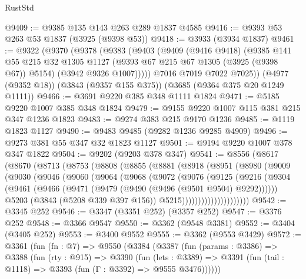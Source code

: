 \begin{lexlean}{RustStd}
\begin{coremodule}
@9409 := @9385 @135 @143 @263 @289 @1837 @4585
@9416 := @9393 @53 @263 @53 @1837 (@3925 (@9398 @53))
@9418 := @3933 (@3934 @1837)
@9461 := @9322
    (@9370
      (@9378
        (@9383
          (@9403
            (@9409
              (@9416 @9418)
              (@9385
                @141
                @55
                @215
                @32
                @1305
                @1127
                (@9393 @67 @215 @67 @1305 (@3925 (@9398 @67)) @5154)
                (@3942 @9326 @1007)))))
        @7016
        @7019
        @7022
        @7025))
    (@4977 (@9352 @18))
    (@3843 (@9357 @155 @375))
    (@3685 (@9364 @375 @20 @1249 @1111))
@9466 := @3691 @9220 @385 @348 @1111 @1824
@9471 := @5185 @9220 @1007 @385 @348 @1824
@9479 := @9155 @9220 @1007 @115 @381 @215 @347 @1236 @1823
@9483 := @9274 @383 @215 @9170 @1236
@9485 := @1119 @1823 @1127
@9490 := @9483 @9485 (@9282 @1236 @9285 @4909)
@9496 := @9273 @381 @55 @347 @32 @1823 @1127
@9501 := @9194 @9220 @1007 @378 @347 @1822
@9504 := @9202 (@9203 @378 @347)
@9541 := @8556
    (@8617
      (@8670
        (@8713
          (@8753
            (@8808
              (@8855
                (@8881
                  (@8918
                    (@8951
                      (@8980
                        (@9009
                          (@9030
                            (@9046
                              (@9060
                                (@9064
                                  (@9068
                                    (@9072
                                      (@9076
                                        (@9125
                                          (@9216
                                            (@9304
                                              (@9461
                                                (@9466
                                                  (@9471
                                                    (@9479 (@9490 (@9496 (@9501 @9504) @9292))))))
                                              @5203
                                              (@3843 (@5208 @339 @397 @156))
                                              @5215)))))))))))))))))))))
@9542 := @3345 @252
@9546 := @3347 (@3351 @252) (@3357 @252)
@9547 := @3376 @252
@9548 := @3366 @9547
@9550 := @3362 (@9548 @3381)
@9552 := @3404 (@3405 @252)
@9553 := @3400 @9552
@9555 := @3362 (@9553 @3429)
@9572 := @3361
    (fun (fn : @7) =>
    @9550
      (@3384
        (@3387
          (fun (params : @3386) =>
          @3388
            (fun (rty : @915) =>
            @3390
              (fun (lets : @3389) =>
              @3391 (fun (tail : @1118) => @3393 (fun (Γ : @3392) => @9555 @3476))))))

\end{coremodule}
\end{lexlean}
